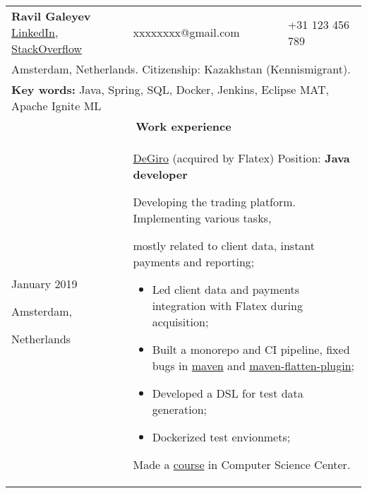 \documentclass{article}
\begin{document}
\begin{longtable}{p{0.00in}p{0.00in}p{0.0in}p{0.00in}p{0.00in}}
\multicolumn{3}{p{\dimexpr3.00in+4\tabcolsep\relax}}{{\fontsize{16pt}{19.2pt}\selectfont
    \textbf{Ravil Galeyev}}
    \href{https://www.linkedin.com/in/ravil-galeyev-9a7540102}{LinkedIn},
    \href{http://stackoverflow.com/story/dehasi}{StackOverflow}
} &
\multicolumn{1}{l}{xxxxxxxx@gmail.com} &
\multicolumn{1}{l}{+31 123 456 789} \\

\multicolumn{5}{p{\dimexpr7.00in+8\tabcolsep\relax}}{
    Amsterdam, Netherlands. Citizenship: Kazakhstan (Kennismigrant).
\par} \\

\multicolumn{5}{p{\dimexpr7.00in+8\tabcolsep\relax}}{
    \textbf{Key words:} Java, Spring, SQL, Docker, Jenkins, Eclipse MAT, Apache Ignite ML
\par} \\

\multicolumn{5}{c}{\textbf{Work experience}} \\

\multicolumn{2}{p{\dimexpr1.00in+2\tabcolsep\relax}}{January 2019 \par Amsterdam,\par Netherlands} &
\multicolumn{3}{p{\dimexpr5.85in+4\tabcolsep\relax}}{\href{https://degiro.nl}{DeGiro} (acquired by Flatex)
Position: \textbf{Java developer} \par
Developing the trading platform. Implementing various tasks,
\par mostly related to client data, instant payments and reporting;
\begin{itemize}
    \item Led client data and payments integration with Flatex during acquisition;
    \item Built a monorepo and CI pipeline, fixed bugs in
          \href{https://github.com/apache/maven/pull/347}{maven}
           and  \href{https://github.com/mojohaus/flatten-maven-plugin/pull/152}{maven-flatten-plugin};
    \item Developed a DSL for test data generation;
    \item Dockerized test envionmets;
    \end{itemize}
    Made a \href{https://compscicenter.ru/courses/practical-minimum/}{course} in Computer Science Center.
\par} \\


\end{longtable}
\end{document}
